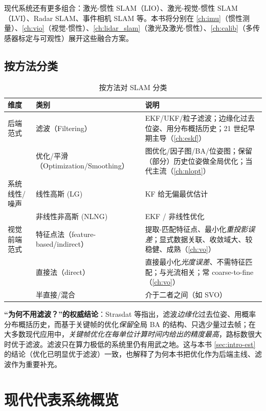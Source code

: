 \noindent 现代系统还有更多组合：激光-惯性 SLAM（LIO）、激光-视觉-惯性 SLAM（LVI）、Radar SLAM、事件相机 SLAM 等。本书将分别在 \cref{ch:imu}（惯性测量）、\cref{ch:vio}（视觉-惯性）、\cref{ch:lidar_slam}（激光及激光-惯性）、\cref{ch:calib}（多传感器标定与可观性）展开这些融合方案。

\subsection{按方法分类}
\label{sec:intro-by-method}
\begin{table}[H]\centering\small
\caption{按方法对 SLAM 分类}
\label{tab:intro-class-method}
\begin{tabular}{p{} p{} p{}}
\toprule
维度 & 类别 & 说明 \\
\midrule
后端范式 & 滤波（Filtering） & EKF/UKF/粒子滤波；边缘化过去位姿、用分布概括历史；21 世纪早期主导（\cref{ch:eskf}） \\
 & 优化/平滑（Optimization/Smoothing） & 图优化/因子图/BA/位姿图；保留（部分）历史位姿做全局优化；当代主流（\cref{ch:nlopt}） \\
系统线性/噪声 & 线性高斯 (LG) & KF 给无偏最优估计 \\
 & 非线性非高斯 (NLNG) & EKF / 非线性优化 \\
视觉前端范式 & 特征点法（feature-based/indirect） & 提取-匹配特征点、最小化\emph{重投影误差}；显式数据关联、收敛域大、较稳健、成熟（\cref{ch:vo}） \\
 & 直接法（direct） & 直接最小化\emph{光度误差}、不需特征匹配；与光流相关；常 coarse-to-fine（\cref{ch:vo}） \\
 & 半直接/混合 & 介于二者之间（如 SVO） \\
\bottomrule
\end{tabular}
\end{table}

\begin{insight}
\textbf{“为何不用滤波？”的权威结论}：Strasdat 等指出，滤波\emph{边缘化}过去位姿、用概率分布概括历史，而基于关键帧的优化\emph{保留}全局 BA 的结构、只选少量过去帧；在大多数现代应用中，\emph{关键帧优化在每单位计算时间内给出的精度最高}，路标数很大时优于滤波。滤波只在算力极低的系统里仍有用武之地。这与本书 \cref{sec:intro-est} 的结论（优化已明显优于滤波）一致，也解释了为何本书把优化作为后端主线、滤波作为重要补充。
\end{insight}

\section{现代代表系统概览}
\label{sec:intro-systems}

